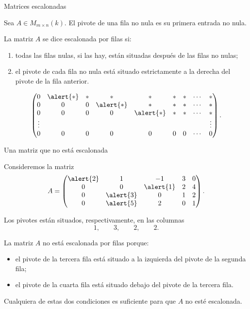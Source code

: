 \begin{frame}{Matrices escalonadas}

\begin{definition}
Sea \(A\in M_{m\times n}(k)\). El \alert{pivote} de una fila no nula
es su primera entrada no nula.

La matriz \(A\) se dice \alert{escalonada por filas} si:

\begin{enumerate}
    \item todas las filas nulas, si las hay, están situadas después
    de las filas no nulas;

    \item el pivote de cada fila no nula está situado estrictamente
    a la derecha del pivote de la fila anterior.
\end{enumerate}

\[
\begin{pmatrix}
0    &\alert{\ast} & \ast & \ast & \ast & \ast & \ast & \cdots & \ast \\
0    & 0    & 0    & \alert{\ast} & \ast & \ast & \ast & \cdots & \ast \\
0    & 0    & 0    & 0    & \alert{\ast} & \ast & \ast & \cdots & \ast \\
\vdots &&&&&&&&\vdots \\
0    & 0    & 0    & 0    & 0    & 0    & 0    & \cdots & 0
\end{pmatrix}.
\]

\end{definition}

\end{frame}

\begin{frame}{Una matriz que no está escalonada}

Consideremos la matriz
\[
A=
\begin{pmatrix}
\alert{2} & 1 & -1 & 3 & 0\\
0 & 0 & \alert{1} & 2 & 4\\
0 & \alert{3} & 0 & 1 & 2\\
0 & \alert{5} & 2 & 0 & 1
\end{pmatrix}.
\]

Los pivotes están situados, respectivamente, en las columnas
\[
1,\qquad 3,\qquad 2,\qquad 2.
\]

\medskip

La matriz \(A\) \alert{no está escalonada por filas} porque:

\begin{itemize}
    \item el pivote de la tercera fila está situado a la izquierda
    del pivote de la segunda fila;

    \item el pivote de la cuarta fila está situado debajo del pivote
    de la tercera fila.
\end{itemize}

Cualquiera de estas dos condiciones es suficiente para que \(A\) no esté escalonada.

\end{frame}

